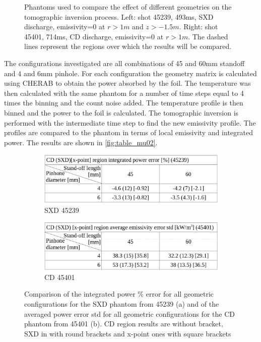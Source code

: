 \begin{figure}[!ht]
    \caption{Phantoms used to compare the effect of different geometries on the tomographic inversion process. Left: shot 45239, 493ms, SXD discharge, emissivity=0 at $r>1m$ and $z>-1.5m$. Right:  shot 45401, 714ms, CD discharge, emissivity=0 at $r>1m$. The dashed lines represent the regions over which the results will be compared.}
    \label{fig:phantoms}
\end{figure}

The configurations investigated are all combinations of 45 and 60mm standoff and 4 and 6mm pinhole. 
For each configuration the geometry matrix is calculated using CHERAB to obtain the power absorbed by the foil. The temperature was then calculated with the same phantom for a number of time steps equal to 4 times the binning and the count noise added. The temperature profile is then binned and the power to the foil is calculated. The tomographic inversion is performed with the intermediate time step to find the new emissivity profile. The profiles are compared to the phantom in terms of local emissivity and integrated power. The results are shown in \autoref{fig:table_mu02}.

\begin{figure}[!ht]
     \centering
     \begin{subfigure}{0.45\textwidth}
         \centering
         \includegraphics[width=\textwidth]{Chapters/appendix1/figs/table45239.png}
         \caption{SXD 45239}
         \label{fig:table45239}
     \end{subfigure}
     \hfill
     \begin{subfigure}{0.45\textwidth}
         \centering
         \includegraphics[width=\textwidth]{Chapters/appendix1/figs/table45401.png}
         \caption{CD 45401}
         \label{fig:table45401}
     \end{subfigure}

    \caption{Comparison of the integrated power $\%$ error for all geometric configurations for the SXD phantom from 45239 (a) and of the averaged power error std for all geometric configurations for the CD phantom from 45401 (b). CD region results are without bracket, SXD in with round brackets and x-point ones with square brackets}
    \label{fig:table_mu02}
\end{figure}

